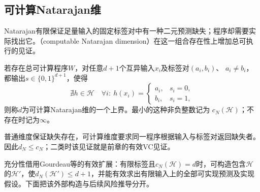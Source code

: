 \subsection{可计算Natarajan维}

Natarajan有限保证足量输入的固定标签对中有一种二元预测缺失；程序却需要实际找出它。（computable Natarajan dimension）在这一组合存在性上增加总可执行的见证。

\begin{definition}[可计算Natarajan维]
\label{def:computable-natarajan-dimension}
若存在总可计算程序$W$，对任意$d+1$个互异输入$x_i$及标签对$(a_i,b_i)$、
$a_i\neq b_i$，都输出$s\in\{0,1\}^{d+1}$，使得
\[
 \nexists h\in\mathcal H\quad
 \forall i:\ h(x_i)=\begin{cases}a_i,&s_i=0,\\b_i,&s_i=1,\end{cases}
\]
则称$d$为可计算Natarajan维的一个上界。最小的这种非负整数记为
$c_N(\mathcal H)$；不存在时记为$\infty$。
\end{definition}

普通维度保证缺失存在，可计算维度要求同一程序根据输入与标签对返回缺失者。因此$d_N\leq c_N$；二类时该见证就是前章的有效VC见证。

充分性借用Gourdeau等的有效扩展：有限标签且$c_N(\mathcal H)=d$时，可构造包含$\mathcal H$的$\mathcal H'$，使$d_N(\mathcal H')\leq d+1$，并能有效求出有限输入上的全部可实现预测及实现假设。下面把该外部构造与后续风险推导分开。

